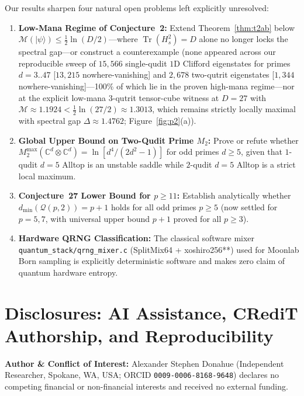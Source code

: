 \documentclass[11pt,letterpaper]{article}
\theoremstyle{plain}
\theoremstyle{definition}
\theoremstyle{remark}
\newcommand{\C}{\mathbb{C}}
\newcommand{\Tr}{\operatorname{Tr}}
\newcommand{\Qcode}{\mathcal{Q}}
\newcommand{\Mana}{\mathcal{M}}
\newcommand{\ket}[1]{\lvert #1 \rangle}
\begin{document}
Our results sharpen four natural open problems left explicitly unresolved:
\begin{enumerate}[leftmargin=2em,itemsep=2pt]
  \item \textbf{Low-Mana Regime of Conjecture~2:} Extend Theorem~\ref{thm:t2ab} below $\Mana(\ket{\psi})\le \tfrac{1}{2}\ln(D/2)$---where $\Tr(H_s^2)=D$ alone no longer locks the spectral gap---or construct a counterexample (none appeared across our reproducible sweep of $15{,}566$ single-qudit $1$D Clifford eigenstates for primes $d=3..47$ [$13{,}215$ nowhere-vanishing] and $2{,}678$ two-qutrit eigenstates [$1{,}344$ nowhere-vanishing]---100\% of which lie in the proven high-mana regime---nor at the explicit low-mana $3$-qutrit tensor-cube witness at $D=27$ with $\Mana\approx 1.1924 < \tfrac{1}{2}\ln(27/2)\approx 1.3013$, which remains strictly locally maximal with spectral gap $\Delta\approx 1.4762$; Figure~\ref{fig:p2}(a)).
  \item \textbf{Global Upper Bound on Two-Qudit Prime $M_2$:} Prove or refute whether $M_2^{\max}(\C^d\otimes\C^d)=\ln[d^4/(2d^2-1)]$ for odd primes $d\ge 5$, given that $1$-qudit $d=5$ Alltop is an unstable saddle while $2$-qudit $d=5$ Alltop is a strict local maximum.
  \item \textbf{Conjecture~27 Lower Bound for $p\ge 11$:} Establish analytically whether $d_{\min}(\Qcode(p,2))=p+1$ holds for all odd primes $p\ge 5$ (now settled for $p=5,7$, with universal upper bound $p+1$ proved for all $p\ge 3$).
  \item \textbf{Hardware QRNG Classification:} The classical software mixer \texttt{quantum\_\allowbreak stack/\allowbreak qrng\_\allowbreak mixer.c} (SplitMix64 + xoshiro256**) used for Moonlab Born sampling is explicitly deterministic software and makes zero claim of quantum hardware entropy.
\end{enumerate}

\section*{Disclosures: AI Assistance, CRediT Authorship, and Reproducibility}

\noindent\textbf{Author \& Conflict of Interest:} Alexander Stephen Donahue (Independent Researcher, Spokane, WA, USA; ORCID \texttt{0009-0006-8168-9648}) declares no competing financial or non-financial interests and received no external funding.
\end{document}
